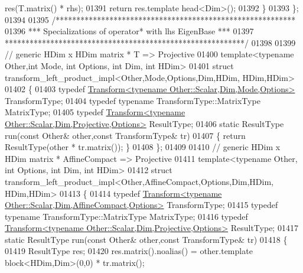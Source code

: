 \begin{DoxyCode}
      res(T.matrix() * rhs);
01391     \textcolor{keywordflow}{return} res.template head<Dim>();
01392   \}
01393 \};
01394 
01395 \textcolor{comment}{/**********************************************************}
01396 \textcolor{comment}{***   Specializations of operator* with lhs EigenBase   ***}
01397 \textcolor{comment}{**********************************************************/}
01398 
01399 \textcolor{comment}{// generic HDim x HDim matrix * T => Projective}
01400 \textcolor{keyword}{template}<\textcolor{keyword}{typename} Other,\textcolor{keywordtype}{int} Mode, \textcolor{keywordtype}{int} Options, \textcolor{keywordtype}{int} Dim, \textcolor{keywordtype}{int} HDim>
01401 \textcolor{keyword}{struct }transform\_left\_product\_impl<Other,Mode,Options,Dim,HDim, HDim,HDim>
01402 \{
01403   \textcolor{keyword}{typedef} \hyperlink{group___geometry___module_class_eigen_1_1_transform}{Transform<typename Other::Scalar,Dim,Mode,Options>}
       TransformType;
01404   \textcolor{keyword}{typedef} \textcolor{keyword}{typename} TransformType::MatrixType MatrixType;
01405   \textcolor{keyword}{typedef} \hyperlink{group___geometry___module_class_eigen_1_1_transform}{Transform<typename Other::Scalar,Dim,Projective,Options>}
       ResultType;
01406   \textcolor{keyword}{static} ResultType run(\textcolor{keyword}{const} Other& other,\textcolor{keyword}{const} TransformType& tr)
01407   \{ \textcolor{keywordflow}{return} ResultType(other * tr.matrix()); \}
01408 \};
01409 
01410 \textcolor{comment}{// generic HDim x HDim matrix * AffineCompact => Projective}
01411 \textcolor{keyword}{template}<\textcolor{keyword}{typename} Other, \textcolor{keywordtype}{int} Options, \textcolor{keywordtype}{int} Dim, \textcolor{keywordtype}{int} HDim>
01412 \textcolor{keyword}{struct }transform\_left\_product\_impl<Other,AffineCompact,Options,Dim,HDim, HDim,HDim>
01413 \{
01414   \textcolor{keyword}{typedef} \hyperlink{group___geometry___module_class_eigen_1_1_transform}{Transform<typename Other::Scalar,Dim,AffineCompact,Options>}
       TransformType;
01415   \textcolor{keyword}{typedef} \textcolor{keyword}{typename} TransformType::MatrixType MatrixType;
01416   \textcolor{keyword}{typedef} \hyperlink{group___geometry___module_class_eigen_1_1_transform}{Transform<typename Other::Scalar,Dim,Projective,Options>}
       ResultType;
01417   \textcolor{keyword}{static} ResultType run(\textcolor{keyword}{const} Other& other,\textcolor{keyword}{const} TransformType& tr)
01418   \{
01419     ResultType res;
01420     res.matrix().noalias() = other.template block<HDim,Dim>(0,0) * tr.matrix();

\end{DoxyCode}
